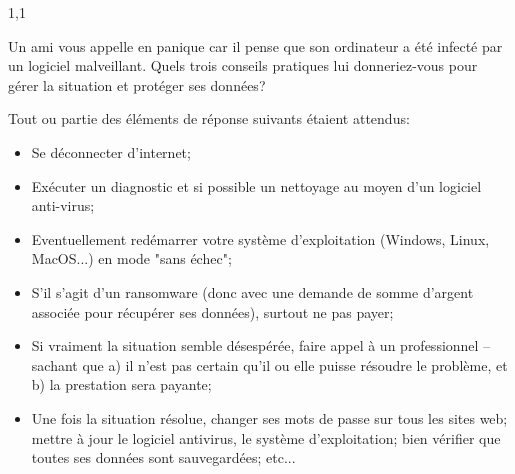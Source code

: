 \documentclass[11pt,a4paper]{exam}
\begin{document}
\begin{spacing}{1,1}
\begin{questions}
        	\question[2] Un ami vous appelle en panique car il pense que son ordinateur a été infecté par un logiciel malveillant. Quels trois conseils pratiques lui donneriez-vous pour gérer la situation et protéger ses données?
        	\begin{solution}
        		Tout ou partie des éléments de réponse suivants étaient attendus:
        		\begin{itemize}
        			\item Se déconnecter d'internet;
        			\item Exécuter un diagnostic et si possible un nettoyage au moyen d'un logiciel anti-virus;
        			\item Eventuellement redémarrer votre système d'exploitation (Windows, Linux, MacOS...) en mode "sans échec";
        			\item S'il s'agit d'un ransomware (donc avec une demande de somme d'argent associée pour récupérer ses données), surtout ne pas payer;
        			\item Si vraiment la situation semble désespérée, faire appel à un professionnel -- sachant que a) il n'est pas certain qu'il ou elle puisse résoudre le problème, et b) la prestation sera payante;
        			\item Une fois la situation résolue, changer ses mots de passe sur tous les sites web; mettre à jour le logiciel antivirus, le système d'exploitation; bien vérifier que toutes ses données sont sauvegardées; etc...
        		\end{itemize}
        	\end{solution}
        		

\end{questions}
\end{spacing}
\end{document}
